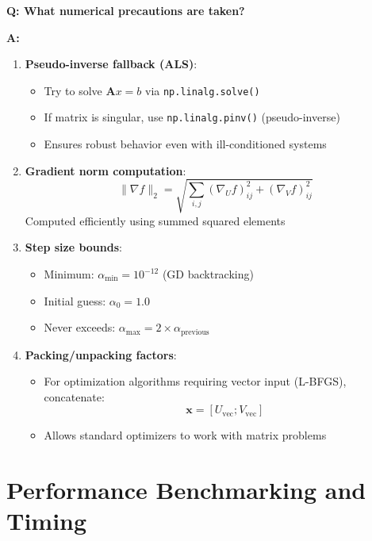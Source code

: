 \documentclass[11pt,oneside]{article}
\newcommand{\grad}{\nabla}
\newcommand{\question}[1]{\textbf{Q: #1}}
\newcommand{\answer}{\textbf{A: }}
\begin{document}
\question{What numerical precautions are taken?}

\answer

\begin{enumerate}
    \item \textbf{Pseudo-inverse fallback (ALS)}:
    \begin{itemize}
        \item Try to solve $\mathbf{A}x = b$ via \texttt{np.linalg.solve()}
        \item If matrix is singular, use \texttt{np.linalg.pinv()} (pseudo-inverse)
        \item Ensures robust behavior even with ill-conditioned systems
    \end{itemize}
    
    \item \textbf{Gradient norm computation}:
    \begin{equation}
        \|\grad f\|_2 = \sqrt{\sum_{i,j}(\grad_U f)_{ij}^2 + (\grad_V f)_{ij}^2}
    \end{equation}
    Computed efficiently using summed squared elements
    
    \item \textbf{Step size bounds}:
    \begin{itemize}
        \item Minimum: $\alpha_{\min} = 10^{-12}$ (GD backtracking)
        \item Initial guess: $\alpha_0 = 1.0$
        \item Never exceeds: $\alpha_{\max} = 2 \times \alpha_{\text{previous}}$
    \end{itemize}
    
    \item \textbf{Packing/unpacking factors}:
    \begin{itemize}
        \item For optimization algorithms requiring vector input (L-BFGS), concatenate:
        \begin{equation}
            \mathbf{x} = [U_{\text{vec}}; V_{\text{vec}}]
        \end{equation}
        \item Allows standard optimizers to work with matrix problems
    \end{itemize}
\end{enumerate}

\section{Performance Benchmarking and Timing}\label{sec:benchmarking}
\end{document}
